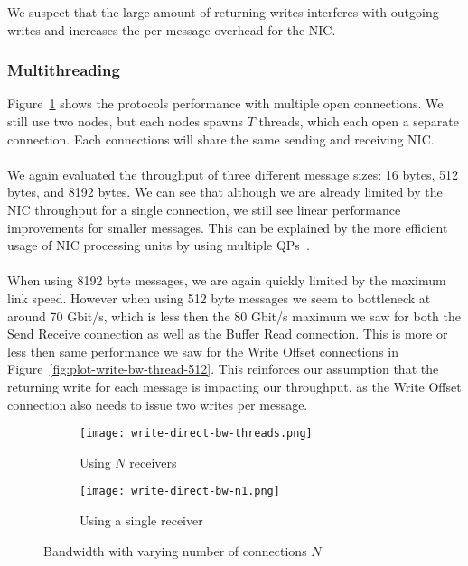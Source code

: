 We suspect that the large amount of returning writes interferes with outgoing writes and increases the per message overhead
for the NIC. 
  

\subsubsection{Multithreading}

Figure~\ref{fig:plot-wdir-bw-threads} shows the protocols performance with multiple open connections. We still use two nodes,
but each nodes spawns $T$ threads, which each open a separate connection. Each connections will share the same sending and 
receiving NIC.

\paragraph{} We again evaluated the throughput of three different message sizes: 16 bytes, 512 bytes, and 8192 bytes. We can see that 
although we are already limited by the NIC throughput for a single connection, we still see linear performance improvements 
for smaller messages. This can be explained by the more efficient usage of NIC processing units by using multiple 
QPs~\cite{anuj-guide}.

\paragraph{} When using 8192 byte messages, we are again quickly limited by the maximum link speed. However when using 
512 byte messages we seem to bottleneck at around 70 Gbit/s, which is less then the 80 Gbit/s maximum we saw for both the
Send Receive connection as well as the Buffer Read connection. This is more or less then same performance we saw for the
Write Offset connections in Figure~\ref{fig:plot-write-bw-thread-512}. This reinforces our assumption that the returning write
for each message is impacting our throughput, as the Write Offset connection also needs to issue two writes per message.

\begin{figure}[ht]
  \begin{subfigure}[b]{0.48\textwidth}
  \centering
  \texttt{[image: write-direct-bw-threads.png]}
  \label{fig:plot-wdir-bw-threads}
  \caption{Using $N$ receivers}
  \end{subfigure}
  \begin{subfigure}[b]{0.48\textwidth}
  \centering
  \texttt{[image: write-direct-bw-n1.png]}
  \label{fig:plot-wdir-bw-n1}
  \caption{Using a single receiver}
  \end{subfigure}
  \caption{Bandwidth with varying number of connections $N$}
\end{figure}

